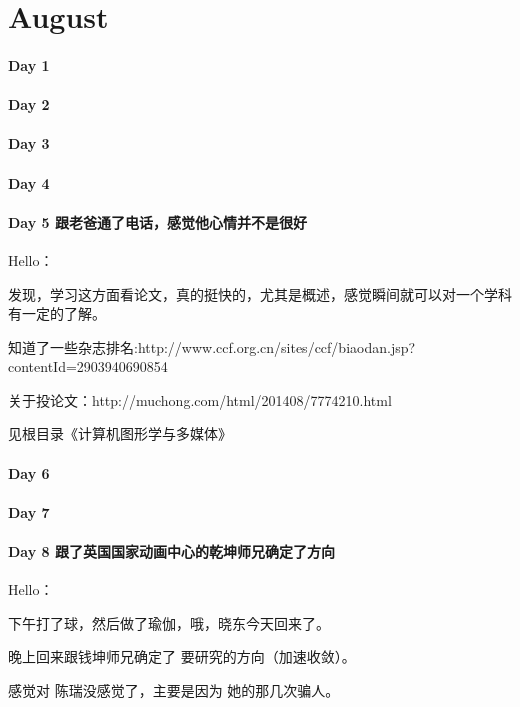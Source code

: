 \documentclass[UTF8,a4paper,8pt]{ctexbook}
\begin{document}
 \section*{August}
 	 \paragraph{Day 1       \quad     }
 	 \paragraph{Day 2       \quad     }
 	 \paragraph{Day 3       \quad     }
 	 \paragraph{Day 4       \quad     }
 	 \paragraph{Day 5  跟老爸通了电话，感觉他心情并不是很好   \quad     }
	 	 Hello：
	 	 
	 	 发现，学习这方面看论文，真的挺快的，尤其是概述，感觉瞬间就可以对一个学科有一定的了解。
	 	 
	 	 知道了一些杂志排名:http://www.ccf.org.cn/sites/ccf/biaodan.jsp?contentId=2903940690854
	 	 
	 	 关于投论文：http://muchong.com/html/201408/7774210.html
	 	 
		 见根目录《计算机图形学与多媒体》
 	 \paragraph{Day 6       \quad     }
 	 \paragraph{Day 7       \quad     }
 	 \paragraph{Day 8   跟了英国国家动画中心的乾坤师兄确定了方向    \quad     }Hello：
 	 
	 	 下午打了球，然后做了瑜伽，哦，晓东今天回来了。
	 	 
	 	 晚上回来跟钱坤师兄确定了 要研究的方向（加速收敛）。
	 	 
	 	 感觉对 陈瑞没感觉了，主要是因为 她的那几次骗人。
\end{document}

